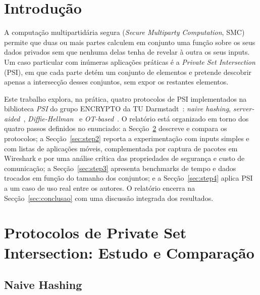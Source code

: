 \section{Introdução}
\label{sec:introducao}

A computação multipartidária segura (\textit{Secure Multiparty Computation}, SMC) permite que duas ou mais partes calculem em conjunto uma função sobre os seus dados privados sem que nenhuma delas tenha de revelar à outra os seus inputs. Um caso particular com inúmeras aplicações práticas é a \textit{Private Set Intersection} (PSI), em que cada parte detém um conjunto de elementos e pretende descobrir apenas a intersecção desses conjuntos, sem expor os restantes elementos.

Este trabalho explora, na prática, quatro protocolos de PSI implementados na biblioteca \textit{PSI} do grupo ENCRYPTO da TU Darmstadt~\cite{psi_repo}: \emph{naive hashing}, \emph{server-aided}~\cite{kamara2014scaling}, \emph{Diffie-Hellman}~\cite{meadows1986matchmaking} e \emph{OT-based}~\cite{pinkas2014faster, pinkas2016scalable}. O relatório está organizado em torno dos quatro passos definidos no enunciado: a Secção~\ref{sec:step1} descreve e compara os protocolos; a Secção~\ref{sec:step2} reporta a experimentação com inputs simples e com listas de aplicações móveis, complementada por captura de pacotes em Wireshark e por uma análise crítica das propriedades de segurança e custo de comunicação; a Secção~\ref{sec:step3} apresenta benchmarks de tempo e dados trocados em função do tamanho dos conjuntos; e a Secção~\ref{sec:step4} aplica PSI a um caso de uso real entre os autores. O relatório encerra na Secção~\ref{sec:conclusao} com uma discussão integrada dos resultados.


\clearpage
\section{Protocolos de Private Set Intersection: Estudo e Comparação}
\label{sec:step1}

\subsection{Naive Hashing}
\label{sec:naive}


